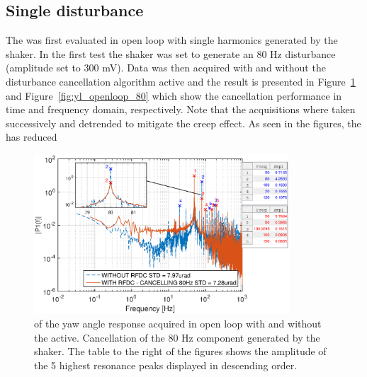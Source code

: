 \subsection{Single disturbance}
The \abbrRFDC was first evaluated in open loop with single harmonics generated by the shaker. In the first test the shaker was set to generate an 80 Hz disturbance (amplitude set to 300 mV). Data was then acquired with and without the disturbance cancellation algorithm active and the result is presented in Figure~\ref{fig:fft_openloop_80} and Figure~\ref{fig:yl_openloop_80} which show the cancellation performance in time and frequency domain, respectively. Note that the acquisitions where taken successively and detrended to mitigate the creep effect. As seen in the figures, the \abbrRFDC has reduced

\begin{figure}[h!]
  \centering %
  \includegraphics[width=0.85\textwidth, trim=0cm 0cm 0cm 0cm, clip=true]{fig/matlab/fft_openloop_ext_disturbance_80Hz_with_zoom}
  \caption{\label{fig:fft_openloop_80} \abbrFFT of the yaw angle response acquired in open loop with and without the \abbrRFDC active. Cancellation of the 80 Hz component generated by the shaker. The table to the right of the figures shows the amplitude of the 5 highest resonance peaks displayed in descending order.}
\end{figure}

